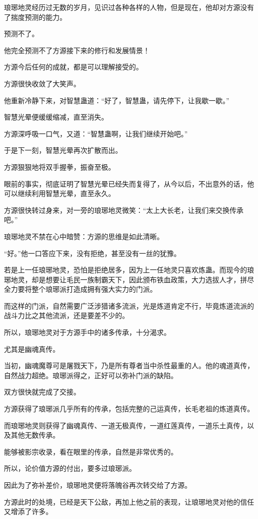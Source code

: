 \begin{this_body}
琅琊地灵经历过无数的岁月，见识过各种各样的人物，但是现在，他却对方源没有了揣度预测的能力。

预测不了。

他完全预测不了方源接下来的修行和发展情景！

方源今后任何的成就，都是可以理解接受的。

方源很快收敛了大笑声。

他重新冷静下来，对智慧蛊道：“好了，智慧蛊，请先停下，让我歇一歇。”

智慧光晕便缓缓缩减，直至消失。

方源深呼吸一口气，又道：“智慧蛊啊，让我们继续开始吧。”

于是下一刻，智慧光晕再次扩散而出。

方源狠狠地将双手握拳，振奋至极。

眼前的事实，彻底证明了智慧光晕已经失而复得了，从今以后，不出意外的话，他可以继续利用智慧光晕，直至永久。

方源很快转过身来，对一旁的琅琊地灵微笑：“太上大长老，让我们来交换传承吧。”

琅琊地灵不禁在心中暗赞：方源的思维是如此清晰。

“好。”他一口答应下来，没有拒绝，甚至没有一丝的犹豫。

若是上一任琅琊地灵，恐怕是拒绝居多，因为上一任地灵只喜欢炼蛊。而现今的琅琊地灵，却是想要让毛民一族制霸天下，因此颁布铁血政策，大力选拔人才，拼尽全力要将整个琅琊派打造成拥有强大实力的门派。

而这样的门派，自然需要广泛涉猎诸多流派，光是炼道肯定不行，毕竟炼道流派的战斗力比之其他流派，还是要差不少的。

所以，琅琊地灵对于方源手中的诸多传承，十分渴求。

尤其是幽魂真传。

当初，幽魂魔尊可是屠戮天下，乃是所有尊者当中杀性最重的人。他的魂道真传，自然战力超绝。琅琊派得之，正好可以弥补门派的缺陷。

双方很快就完成了交接。

方源获得了琅琊派几乎所有的传承，包括完整的己运真传，长毛老祖的炼道真传。

而琅琊地灵则获得了幽魂真传、一道无极真传，一道红莲真传，一道乐土真传，以及其他无数传承。

能够被影宗收录，看在眼里的传承，自然是非常优秀的。

所以，论价值方源的付出，要多过琅琊派。

因此为了弥补差价，琅琊地灵便将落魄谷再次转交给了方源。

方源此时的处境，已经是天下公敌，再加上他之前的表现，让琅琊地灵对他的信任又增添了许多。


\end{this_body}
